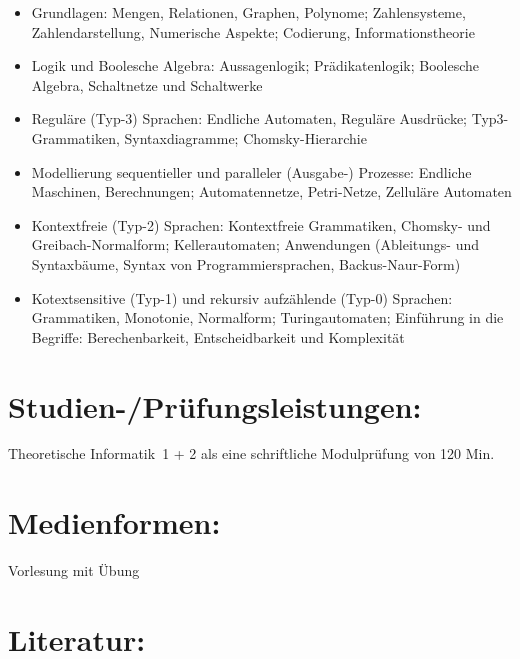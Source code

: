 \begin{itemize}
\item
  Grundlagen: Mengen, Relationen, Graphen, Polynome; Zahlensysteme,
  Zahlendarstellung, Numerische Aspekte; Codierung, Informationstheorie
\item
  Logik und Boolesche Algebra: Aussagenlogik; Prädikatenlogik; Boolesche
  Algebra, Schaltnetze und Schaltwerke
\item
  Reguläre (Typ-3) Sprachen: Endliche Automaten, Reguläre Ausdrücke;
  Typ3-Grammatiken, Syntaxdiagramme; Chomsky-Hierarchie
\item
  Modellierung sequentieller und paralleler (Ausgabe-) Prozesse:
  Endliche Maschinen, Berechnungen; Automatennetze, Petri-Netze,
  Zelluläre Automaten
\item
  Kontextfreie (Typ-2) Sprachen: Kontextfreie Grammatiken, Chomsky- und
  Greibach-Normalform; Kellerautomaten; Anwendungen (Ableitungs- und
  Syntaxbäume, Syntax von Programmiersprachen, Backus-Naur-Form)
\item
  Kotextsensitive (Typ-1) und rekursiv aufzählende (Typ-0) Sprachen:
  Grammatiken, Monotonie, Normalform; Turingautomaten; Einführung in die
  Begriffe: Berechenbarkeit, Entscheidbarkeit und Komplexität
\end{itemize}

\section{Studien-/Prüfungsleistungen:}\label{studien-pruxfcfungsleistungen-27}

Theoretische Informatik~1 + 2 als eine schriftliche Modulprüfung von 120
Min.

\section{Medienformen:}\label{medienformen-27}

Vorlesung mit Übung

\section{Literatur:}\label{literatur-27}

